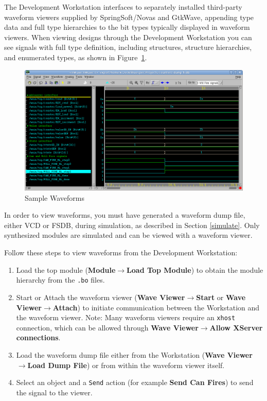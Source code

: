 \documentclass{article}
\newcommand{\te}[1]{\texttt{#1}}
\begin{document}
The Development Workstation  interfaces to separately
installed third-party  waveform viewers supplied by SpringSoft/Novas
and GtkWave,  appending type data and full type
hierarchies to the bit types typically displayed in  waveform
viewers.  When viewing designs through the Development Workstation
you can see signals with full type definition, including structures, structure
hierarchies, and  enumerated types, as shown in Figure~\ref{fig-waveviewer}.

\begin{figure}[ht]
\begin{center}
\includegraphics[width = 5 in]{figures/waveviewer}
\caption{Sample Waveforms}
\label{fig-waveviewer}
\end{center}
\end{figure}

In order to view waveforms, you must have generated a waveform dump
file, either VCD or FSDB,  during simulation, as described in Section \ref{simulate}.   Only synthesized modules are
simulated and can be viewed with a waveform viewer.

Follow these steps to view waveforms from the Development Workstation:
\begin{enumerate}
\item Load the top module ({\bf Module$\rightarrow$Load Top Module})
to obtain  the module hierarchy from the \te{.bo} files.
\item Start or Attach the waveform viewer ({\bf Wave
Viewer$\rightarrow$Start} or {\bf Wave Viewer$\rightarrow$Attach}) to
initiate communication between the Workstation and the waveform
viewer. Note:  Many waveform viewers require an \te{xhost}
connection, which can be allowed through {\bf Wave
Viewer$\rightarrow$Allow XServer connections}.
\item Load the waveform dump file either from the Workstation ({\bf Wave
Viewer$\rightarrow$Load Dump File}) or from within the waveform viewer
itself.
\item Select an object and a \te{Send} action (for example {\bf Send
Can Fires}) to send the signal to the
viewer.
\end{enumerate}
\end{document}

